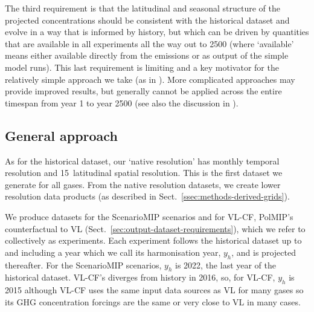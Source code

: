 The third requirement is that the latitudinal and seasonal structure of the projected concentrations
should be consistent with the historical dataset
and evolve in a way that is informed by history,
but which can be driven by quantities that are available in all experiments all the way out to 2500
(where `available' means either available directly from the emissions or as output of the simple model runs).
This last requirement is limiting and a key motivator for the relatively simple approach we take
(as in \citealp{meinshausen_ssp-ghgs_2020}).
More complicated approaches may provide improved results,
but generally cannot be applied across the entire timespan from year 1 to year 2500 (see also the discussion in \citealp{nicholls_historical-ghgs_2026}).

\subsection{General approach}
\label{ssec:methods-general-approach}

As for the historical dataset, our `native resolution'
has monthly temporal resolution and 15\textdegree~latitudinal spatial resolution.
This is the first dataset we generate for all gases.
From the native resolution datasets, we create lower resolution data products
(as described in Sect.~\ref{ssec:methods-derived-grids}).

We produce datasets for the ScenarioMIP scenarios
and for VL-CF, PolMIP's counterfactual to VL (Sect.~\ref{sec:output-dataset-requirements}),
which we refer to collectively as experiments.
Each experiment follows the historical dataset up to and including
a year which we call its harmonisation year, $y_h$,
and is projected thereafter.
For the ScenarioMIP scenarios, $y_h$ is 2022, the last year of the historical dataset.
VL-CF's diverges from history in 2016, so, for VL-CF, $y_h$ is 2015
although VL-CF uses the same input data sources as VL for many gases
so its GHG concentration forcings are the same or very close to VL in many cases.

